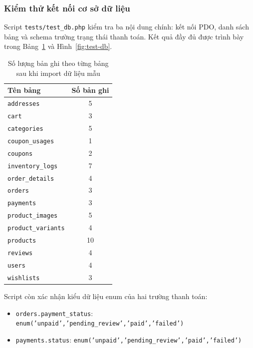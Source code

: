 \documentclass[11pt, a4paper]{article}
\begin{document}
\subsubsection{Kiểm thử kết nối cơ sở dữ liệu}

Script \texttt{tests/test\_db.php} kiểm tra ba nội dung chính: kết nối PDO,
danh sách bảng và schema trường trạng thái thanh toán. Kết quả đầy đủ
được trình bày trong Bảng~\ref{tab:db-counts} và Hình~\ref{fig:test-db}.

\begin{table}[H]
    \centering
    \caption{Số lượng bản ghi theo từng bảng sau khi import dữ liệu mẫu}
    \label{tab:db-counts}
    \begin{tabular}{|l|c|}
        \hline
        \textbf{Tên bảng} & \textbf{Số bản ghi} \\ \hline
        \texttt{addresses}         & 5  \\ \hline
        \texttt{cart}              & 3  \\ \hline
        \texttt{categories}        & 5  \\ \hline
        \texttt{coupon\_usages}    & 1  \\ \hline
        \texttt{coupons}           & 2  \\ \hline
        \texttt{inventory\_logs}   & 7  \\ \hline
        \texttt{order\_details}    & 4  \\ \hline
        \texttt{orders}            & 3  \\ \hline
        \texttt{payments}          & 3  \\ \hline
        \texttt{product\_images}   & 5  \\ \hline
        \texttt{product\_variants} & 4  \\ \hline
        \texttt{products}          & 10 \\ \hline
        \texttt{reviews}           & 4  \\ \hline
        \texttt{users}             & 4  \\ \hline
        \texttt{wishlists}         & 3  \\ \hline
    \end{tabular}
\end{table}

Script còn xác nhận kiểu dữ liệu enum của hai trường thanh toán:

\begin{itemize}[leftmargin=*]
    \item \texttt{orders.payment\_status}:
          \texttt{enum('unpaid','pending\_review','paid','failed')}
    \item \texttt{payments.status}:
          \texttt{enum('unpaid','pending\_review','paid','failed')}
\end{itemize}
\end{document}
